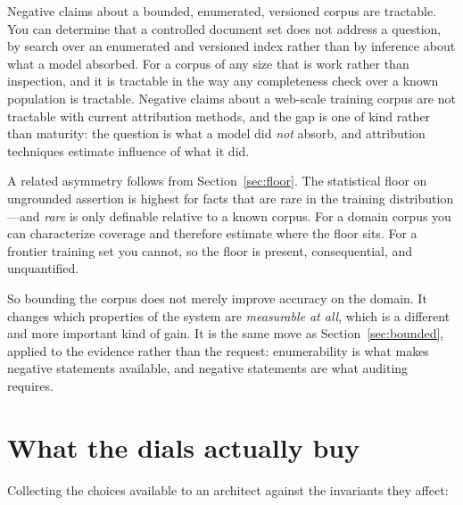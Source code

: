 Negative claims about a bounded, enumerated, versioned corpus are tractable. You can
determine that a controlled document set does not address a question, by search over
an enumerated and versioned index rather than by inference about what a model
absorbed. For a corpus of any size that is work rather than inspection, and it is
tractable in the way any completeness check over a known population is tractable. Negative claims about a web-scale training corpus are not
tractable with current attribution methods, and the gap is one of kind rather than
maturity: the question is what a model did \emph{not} absorb, and attribution
techniques estimate influence of what it did.

A related asymmetry follows from Section~\ref{sec:floor}. The statistical floor on
ungrounded assertion is highest for facts that are rare in the training
distribution---and \emph{rare} is only definable relative to a known corpus. For a
domain corpus you can characterize coverage and therefore estimate where the floor
sits. For a frontier training set you cannot, so the floor is present, consequential,
and unquantified.

So bounding the corpus does not merely improve accuracy on the domain. It changes
which properties of the system are \emph{measurable at all}, which is a different and
more important kind of gain. It is the same move as
Section~\ref{sec:bounded}, applied to the evidence rather than the request:
enumerability is what makes negative statements available, and negative statements
are what auditing requires.

\section{What the dials actually buy}

Collecting the choices available to an architect against the invariants they affect:

